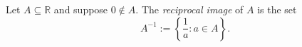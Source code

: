 \begin{definition}
\label{def:reciprocal-image}
Let $A\subseteq\mathbb{R}$ and suppose $0\notin A$.  The \emph{reciprocal
image} of $A$ is the set
\[
  A^{-1}:=\left\{\frac{1}{a}:a\in A\right\}.
\]
\end{definition}